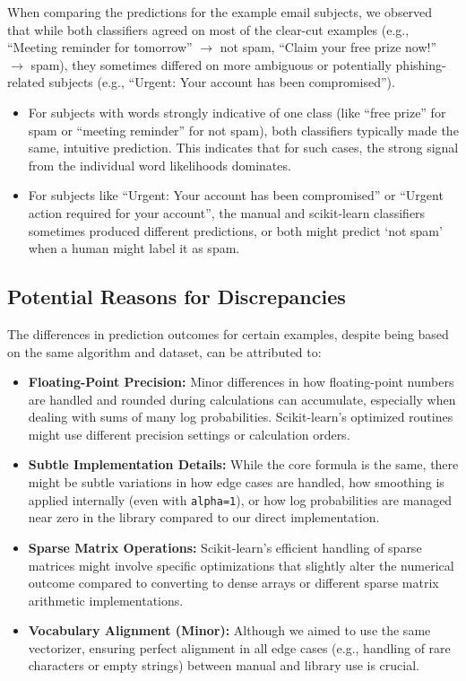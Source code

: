 \documentclass[12pt,letterpaper]{article}
\begin{document}
When comparing the predictions for the example email subjects, we observed that while both classifiers agreed on most of the clear-cut examples (e.g., ``Meeting reminder for tomorrow'' $\rightarrow$ not spam, ``Claim your free prize now!'' $\rightarrow$ spam), they sometimes differed on more ambiguous or potentially phishing-related subjects (e.g., ``Urgent: Your account has been compromised'').

\begin{itemize}
    \item For subjects with words strongly indicative of one class (like ``free prize'' for spam or ``meeting reminder'' for not spam), both classifiers typically made the same, intuitive prediction. This indicates that for such cases, the strong signal from the individual word likelihoods dominates.
    
    \item For subjects like ``Urgent: Your account has been compromised'' or ``Urgent action required for your account'', the manual and scikit-learn classifiers sometimes produced different predictions, or both might predict `not spam' when a human might label it as spam.
\end{itemize}

\subsection{Potential Reasons for Discrepancies}

The differences in prediction outcomes for certain examples, despite being based on the same algorithm and dataset, can be attributed to:

\begin{itemize}
    \item \textbf{Floating-Point Precision:} Minor differences in how floating-point numbers are handled and rounded during calculations can accumulate, especially when dealing with sums of many log probabilities. Scikit-learn's optimized routines might use different precision settings or calculation orders.
    
    \item \textbf{Subtle Implementation Details:} While the core formula is the same, there might be subtle variations in how edge cases are handled, how smoothing is applied internally (even with \texttt{alpha=1}), or how log probabilities are managed near zero in the library compared to our direct implementation.
    
    \item \textbf{Sparse Matrix Operations:} Scikit-learn's efficient handling of sparse matrices might involve specific optimizations that slightly alter the numerical outcome compared to converting to dense arrays or different sparse matrix arithmetic implementations.
    
    \item \textbf{Vocabulary Alignment (Minor):} Although we aimed to use the same vectorizer, ensuring perfect alignment in all edge cases (e.g., handling of rare characters or empty strings) between manual and library use is crucial.
\end{itemize}
\end{document}
